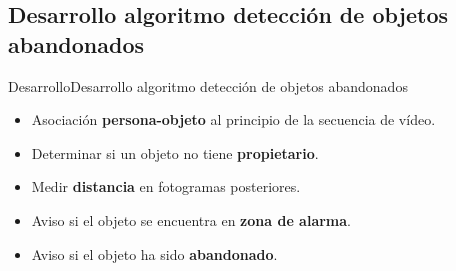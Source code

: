 \subsection{Desarrollo algoritmo detección de objetos abandonados}

\begin{frame}{Desarrollo}{Desarrollo algoritmo detección de objetos abandonados}

\begin{itemize}
    \item Asociación \textbf{persona-objeto} al principio de la secuencia de vídeo.
    \item Determinar si un objeto no tiene \textbf{propietario}.
    \item Medir \textbf{distancia} en fotogramas posteriores.
    \item Aviso si el objeto se encuentra en \textbf{zona de alarma}.
    \item Aviso si el objeto ha sido \textbf{abandonado}.
    
\end{itemize}


\end{frame}
